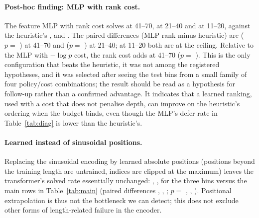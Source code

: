 \paragraph{Post-hoc finding: MLP with rank cost.} The feature MLP with rank cost solves  at 41--70,  at 21--40 and  at 11--20, against the heuristic's ,  and . The paired differences (MLP rank minus heuristic) are  ($p=$ ) at 41--70 and  ($p=$ ) at 21--40; at 11--20 both are at the ceiling. Relative to the MLP with $-\log p$ cost, the rank cost adds  at 41--70 ($p=$ ). This is the only configuration that beats the heuristic, it was not among the registered hypotheses, and it was selected after seeing the test bins from a small family of four policy/cost combinations; the result should be read as a hypothesis for follow-up rather than a confirmed advantage. It indicates that a learned ranking, used with a cost that does not penalise depth, can improve on the heuristic's ordering when the budget binds, even though the MLP's defer rate in Table~\ref{tab:diag} is lower than the heuristic's.

\paragraph{Learned instead of sinusoidal positions.} Replacing the sinusoidal encoding by learned absolute positions (positions beyond the training length are untrained, indices are clipped at the maximum) leaves the transformer's solved rate essentially unchanged: , ,  for the three bins versus the main rows in Table~\ref{tab:main} (paired differences , , ; $p=$ , , ). Positional extrapolation is thus not the bottleneck we can detect; this does not exclude other forms of length-related failure in the encoder.

